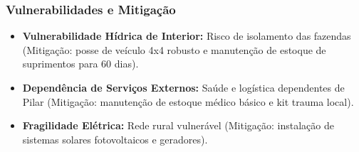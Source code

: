 \subsubsection{Vulnerabilidades e
Mitigação}

\begin{itemize}
\tightlist
\item
  \textbf{Vulnerabilidade Hídrica de Interior:} Risco de isolamento das
  fazendas (Mitigação: posse de veículo 4x4 robusto e manutenção de
  estoque de suprimentos para 60 dias).
\item
  \textbf{Dependência de Serviços Externos:} Saúde e logística
  dependentes de Pilar (Mitigação: manutenção de estoque médico básico e
  kit trauma local).
\item
  \textbf{Fragilidade Elétrica:} Rede rural vulnerável (Mitigação:
  instalação de sistemas solares fotovoltaicos e geradores).
\end{itemize}


